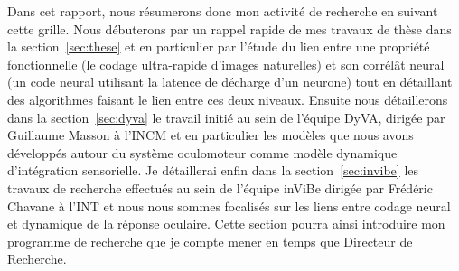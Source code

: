 \documentclass[11pt,french,a4paper,oneside]{article}%
\begin{document}
Dans cet rapport, nous résumerons donc mon activité de recherche en suivant cette grille. Nous débuterons par un rappel rapide de mes travaux de thèse dans la section~\ref{sec:these} et en particulier par l'étude du lien entre une propriété fonctionnelle (le codage ultra-rapide d'images naturelles) et son corrélât neural (un code neural utilisant la latence de décharge d'un neurone) tout en détaillant des algorithmes faisant le lien entre ces deux niveaux. Ensuite nous détaillerons dans la section~\ref{sec:dyva} le travail initié au sein de l'équipe {\sc DyVA}, dirigée par Guillaume Masson à l'INCM et en particulier les modèles que nous avons développés autour du système oculomoteur comme modèle dynamique d'intégration sensorielle. Je détaillerai enfin dans la section~\ref{sec:invibe} les travaux de recherche effectués au sein de l'équipe {\sc inViBe} dirigée par Frédéric Chavane à l'INT et nous nous sommes focalisés sur les liens entre codage neural et dynamique de la réponse oculaire. %
Cette section pourra ainsi introduire mon programme de recherche que je compte mener en temps que Directeur de Recherche. 
\end{document}
